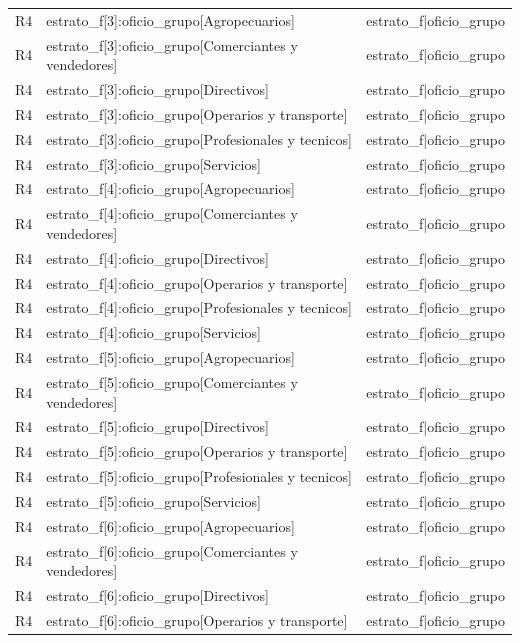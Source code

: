 \begin{longtable}{lll}
R4 & estrato\_f[3]:oficio\_grupo[Agropecuarios] & estrato\_f|oficio\_grupo \\
R4 & estrato\_f[3]:oficio\_grupo[Comerciantes y vendedores] & estrato\_f|oficio\_grupo \\
R4 & estrato\_f[3]:oficio\_grupo[Directivos] & estrato\_f|oficio\_grupo \\
R4 & estrato\_f[3]:oficio\_grupo[Operarios y transporte] & estrato\_f|oficio\_grupo \\
R4 & estrato\_f[3]:oficio\_grupo[Profesionales y tecnicos] & estrato\_f|oficio\_grupo \\
R4 & estrato\_f[3]:oficio\_grupo[Servicios] & estrato\_f|oficio\_grupo \\
R4 & estrato\_f[4]:oficio\_grupo[Agropecuarios] & estrato\_f|oficio\_grupo \\
R4 & estrato\_f[4]:oficio\_grupo[Comerciantes y vendedores] & estrato\_f|oficio\_grupo \\
R4 & estrato\_f[4]:oficio\_grupo[Directivos] & estrato\_f|oficio\_grupo \\
R4 & estrato\_f[4]:oficio\_grupo[Operarios y transporte] & estrato\_f|oficio\_grupo \\
R4 & estrato\_f[4]:oficio\_grupo[Profesionales y tecnicos] & estrato\_f|oficio\_grupo \\
R4 & estrato\_f[4]:oficio\_grupo[Servicios] & estrato\_f|oficio\_grupo \\
R4 & estrato\_f[5]:oficio\_grupo[Agropecuarios] & estrato\_f|oficio\_grupo \\
R4 & estrato\_f[5]:oficio\_grupo[Comerciantes y vendedores] & estrato\_f|oficio\_grupo \\
R4 & estrato\_f[5]:oficio\_grupo[Directivos] & estrato\_f|oficio\_grupo \\
R4 & estrato\_f[5]:oficio\_grupo[Operarios y transporte] & estrato\_f|oficio\_grupo \\
R4 & estrato\_f[5]:oficio\_grupo[Profesionales y tecnicos] & estrato\_f|oficio\_grupo \\
R4 & estrato\_f[5]:oficio\_grupo[Servicios] & estrato\_f|oficio\_grupo \\
R4 & estrato\_f[6]:oficio\_grupo[Agropecuarios] & estrato\_f|oficio\_grupo \\
R4 & estrato\_f[6]:oficio\_grupo[Comerciantes y vendedores] & estrato\_f|oficio\_grupo \\
R4 & estrato\_f[6]:oficio\_grupo[Directivos] & estrato\_f|oficio\_grupo \\
R4 & estrato\_f[6]:oficio\_grupo[Operarios y transporte] & estrato\_f|oficio\_grupo \\

\end{longtable}
